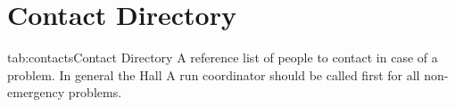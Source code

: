 
\chapter{Contact Directory}
\begin{namestab}{tab:contacts}{Contact Directory}{%
          A reference list of people to contact in case of a problem.   In general the Hall A run coordinator should be called first
          for all non-emergency problems.}
\end{namestab}


